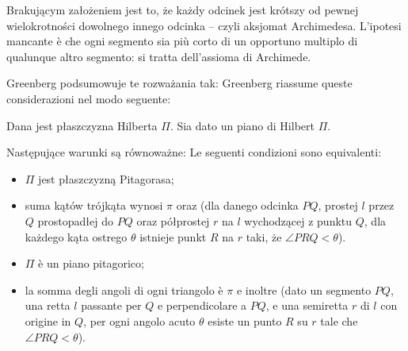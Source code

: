 Brakującym założeniem jest to, że każdy odcinek jest krótszy od pewnej wielokrotności dowolnego innego odcinka -- czyli aksjomat Archimedesa. %
L'ipotesi mancante è che ogni segmento sia più corto di un opportuno multiplo di qualunque altro segmento: si tratta dell'assioma di Archimede. %


Greenberg podsumowuje te rozważania tak: %
Greenberg riassume queste considerazioni nel modo seguente: %

\begin{proposition}
    Dana jest płaszczyzna Hilberta $\Pi$. %
    Sia dato un piano di Hilbert $\Pi$. %

    Następujące warunki są równoważne: %
    Le seguenti condizioni sono equivalenti: %
    \begin{itemize}
        \item $\Pi$ jest płaszczyzną Pitagorasa; %
        \item suma kątów trójkąta wynosi $\pi$ oraz (dla danego odcinka $PQ$, prostej $l$ przez $Q$ prostopadłej do $PQ$ oraz półprostej $r$ na $l$ wychodzącej z punktu $Q$, dla każdego kąta ostrego $\theta$ istnieje punkt $R$ na $r$ taki, że $\angle PRQ < \theta$). %
        \item $\Pi$ è un piano pitagorico; %
        \item la somma degli angoli di ogni triangolo è $\pi$ e inoltre (dato un segmento $PQ$, una retta $l$ passante per $Q$ e perpendicolare a $PQ$, e una semiretta $r$ di $l$ con origine in $Q$, per ogni angolo acuto $\theta$ esiste un punto $R$ su $r$ tale che $\angle PRQ < \theta$). %
    \end{itemize}
\end{proposition}

%